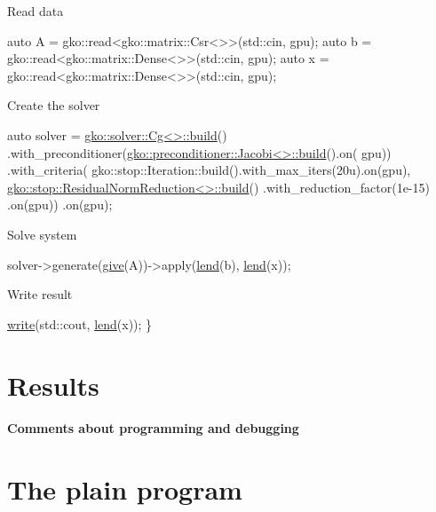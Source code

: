 Read data


\begin{DoxyCode}
\textcolor{keyword}{auto} A = gko::read<gko::matrix::Csr<>>(std::cin, gpu);
\textcolor{keyword}{auto} b = gko::read<gko::matrix::Dense<>>(std::cin, gpu);
\textcolor{keyword}{auto} x = gko::read<gko::matrix::Dense<>>(std::cin, gpu);
\end{DoxyCode}


Create the solver


\begin{DoxyCode}
\textcolor{keyword}{auto} solver =
    \hyperlink{classgko_1_1solver_1_1Cg}{gko::solver::Cg<>::build}()
        .with\_preconditioner(\hyperlink{classgko_1_1preconditioner_1_1Jacobi}{gko::preconditioner::Jacobi<>::build}().on(
      gpu))
        .with\_criteria(
            gko::stop::Iteration::build().with\_max\_iters(20u).on(gpu),
            \hyperlink{classgko_1_1stop_1_1ResidualNormReduction}{gko::stop::ResidualNormReduction<>::build}()
                .with\_reduction\_factor(1e-15)
                .on(gpu))
        .on(gpu);
\end{DoxyCode}


Solve system


\begin{DoxyCode}
solver->generate(\hyperlink{namespacegko_acbd3fd6d07e498892881e8e2ab0b4167}{give}(A))->apply(\hyperlink{namespacegko_aa8cb4876b72e5e1036ea9575443c439b}{lend}(b), \hyperlink{namespacegko_aa8cb4876b72e5e1036ea9575443c439b}{lend}(x));
\end{DoxyCode}


Write result


\begin{DoxyCode}
    \hyperlink{namespacegko_a859dc47a462721d83728d91ab7fa2148}{write}(std::cout, \hyperlink{namespacegko_aa8cb4876b72e5e1036ea9575443c439b}{lend}(x));
\}
\end{DoxyCode}
 \label{_Results}%
\section*{Results}

\label{_Commentsaboutprogramminganddebugging}%
\paragraph*{Comments about programming and debugging }

\label{_PlainProg}%
 \section*{The plain program}


\begin{DoxyCodeInclude}
\end{DoxyCodeInclude}
 